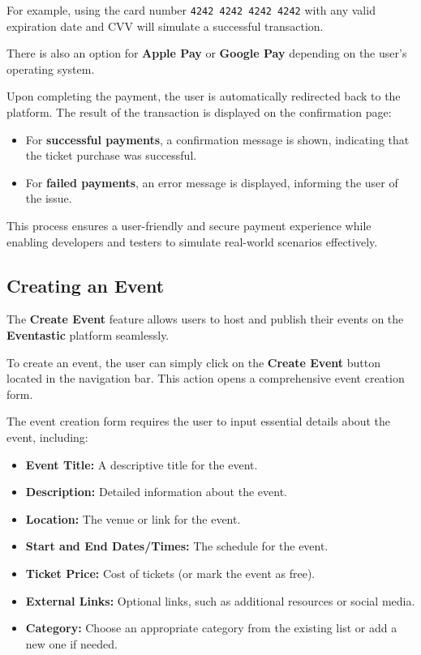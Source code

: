 For example, using the card number \texttt{4242 4242 4242 4242} with any valid expiration date and CVV will simulate a successful transaction.

There is also an option for \textbf{Apple Pay} or \textbf{Google Pay} depending on the user's operating system.

Upon completing the payment, the user is automatically redirected back to the platform. The result of the transaction is displayed on the confirmation page:
\begin{itemize}
    \item For \textbf{successful payments}, a confirmation message is shown, indicating that the ticket purchase was successful.
    \item For \textbf{failed payments}, an error message is displayed, informing the user of the issue.
\end{itemize}

This process ensures a user-friendly and secure payment experience while enabling developers and testers to simulate real-world scenarios effectively.


\subsection{Creating an Event}
The \textbf{Create Event} feature allows users to host and publish their events on the \textbf{Eventastic} platform seamlessly.

To create an event, the user can simply click on the \textbf{Create Event} button located in the navigation bar. This action opens a comprehensive event creation form.


The event creation form requires the user to input essential details about the event, including:
\begin{itemize}
    \item \textbf{Event Title:} A descriptive title for the event.
    \item \textbf{Description:} Detailed information about the event.
    \item \textbf{Location:} The venue or link for the event.
    \item \textbf{Start and End Dates/Times:} The schedule for the event.
    \item \textbf{Ticket Price:} Cost of tickets (or mark the event as free).
    \item \textbf{External Links:} Optional links, such as additional resources or social media.
    \item \textbf{Category:} Choose an appropriate category from the existing list or add a new one if needed.
\end{itemize}

